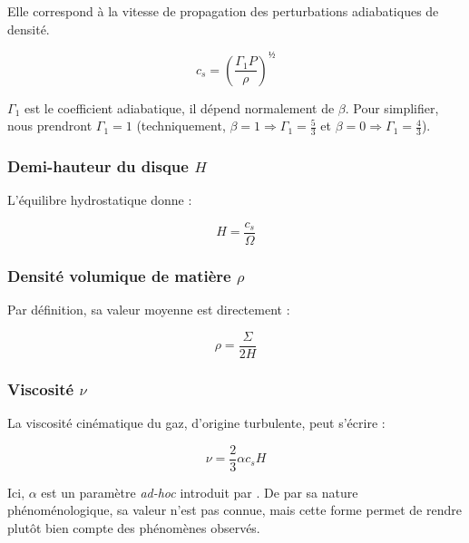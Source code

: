 Elle correspond à la vitesse de propagation des perturbations adiabatiques de densité.

\begin{equation}
    \label{eq:vitesse_son}
    c_s = \left( \frac{\Gamma_1 P}{\rho} \right)^½
\end{equation}

$\Gamma_1$ est le coefficient adiabatique, il dépend normalement de $\beta$.
Pour simplifier, nous prendront $\Gamma_1 = 1$ (techniquement, $\beta = \num{1}
\Rightarrow \Gamma_1 = \frac{5}{3}$ et $\beta = \num{0} \Rightarrow \Gamma_1 =
\frac{4}{3}$).

\subsubsection{\texorpdfstring{Demi-hauteur du disque $H$}{Demi-hauteur du disque H}}

L’équilibre hydrostatique donne :

\begin{equation}
    \label{eq:hauteur}
    H = \frac{c_s}{\Omega}
\end{equation}

\subsubsection{\texorpdfstring{Densité volumique de matière $\rho$}{Densité volumique de matière ρ}}

Par définition, sa valeur moyenne est directement :

\begin{equation}
    \label{eq:densite}
    \rho = \frac{\Sigma}{2 H}
\end{equation}

\subsubsection{\texorpdfstring{Viscosité $\nu$}{Viscosité ν}}

La viscosité cinématique du gaz, d’origine turbulente, peut s’écrire :

\begin{equation}
    \label{eq:viscosite}
    \nu = \frac{2}{3} \alpha c_s H
\end{equation}

Ici, $\alpha$ est un paramètre \textit{ad-hoc} introduit par \citet{1973}. De
par sa nature phénoménologique, sa valeur n’est pas connue, mais cette forme
permet de rendre plutôt bien compte des phénomènes observés.

